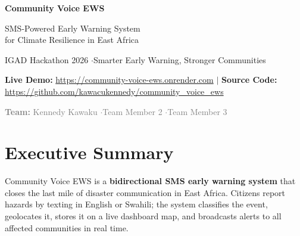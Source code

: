 \documentclass[11pt,a4paper]{article}
\begin{document}
\begin{center}
  \vspace*{2cm}
  {\fontsize{40}{48}\selectfont\bfseries\color{accent} Community Voice EWS\par}
  \vspace{0.4cm}
  {\fontsize{20}{26}\selectfont\color{dark} SMS-Powered Early Warning System \\ for Climate Resilience in East Africa\par}
  \vspace{0.6cm}
  {\large\color{grey} IGAD Hackathon 2026 \quad$\cdot$\quad Smarter Early Warning, Stronger Communities\par}
  \vspace{1.5cm}

  \begin{infobox}
    \centering
    \textbf{Live Demo:} \url{https://community-voice-ews.onrender.com} \quad$\mid$\quad
    \textbf{Source Code:} \url{https://github.com/kawacukennedy/community_voice_ews}
  \end{infobox}

  \vspace{0.8cm}
  \textcolor{grey}{\large \textbf{Team:} Kennedy Kawaku \quad$\cdot$\quad Team Member 2 \quad$\cdot$\quad Team Member 3}

  \vfill
\end{center}

\newpage

\section{Executive Summary}

Community Voice EWS is a \textbf{bidirectional SMS early warning system} that closes the last mile of disaster communication in East Africa. Citizens report hazards by texting in English or Swahili; the system classifies the event, geolocates it, stores it on a live dashboard map, and broadcasts alerts to all affected communities in real time.
\end{document}
